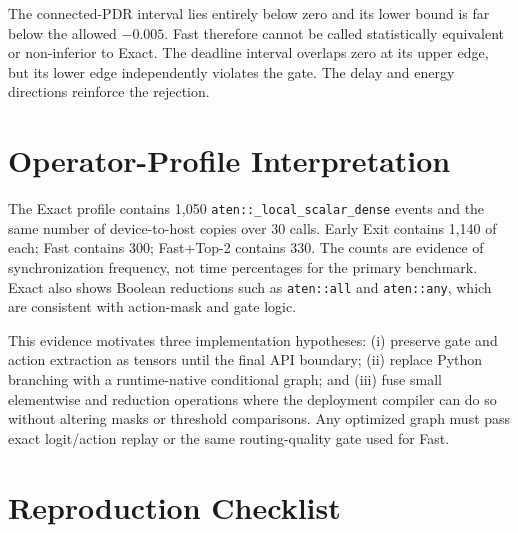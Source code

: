 \documentclass[drones,article,submit,moreauthors]{Definitions/mdpi}
\begin{document}
The connected-PDR interval lies entirely below zero and its lower bound is far below the allowed $-0.005$. Fast therefore cannot be called statistically equivalent or non-inferior to Exact. The deadline interval overlaps zero at its upper edge, but its lower edge independently violates the gate. The delay and energy directions reinforce the rejection.

\section{Operator-Profile Interpretation}

The Exact profile contains 1,050 \texttt{aten::\_local\_scalar\_dense} events and the same number of device-to-host copies over 30 calls. Early Exit contains 1,140 of each; Fast contains 300; Fast+Top-2 contains 330. The counts are evidence of synchronization frequency, not time percentages for the primary benchmark. Exact also shows Boolean reductions such as \texttt{aten::all} and \texttt{aten::any}, which are consistent with action-mask and gate logic.

This evidence motivates three implementation hypotheses: (i) preserve gate and action extraction as tensors until the final API boundary; (ii) replace Python branching with a runtime-native conditional graph; and (iii) fuse small elementwise and reduction operations where the deployment compiler can do so without altering masks or threshold comparisons. Any optimized graph must pass exact logit/action replay or the same routing-quality gate used for Fast.

\section{Reproduction Checklist}
\end{document}
